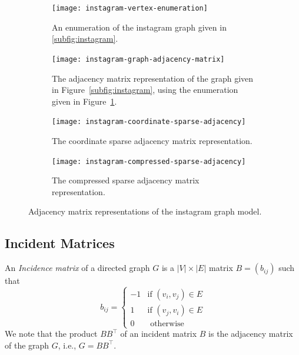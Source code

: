 \begin{figure}[tbh]
  \begin{subfigure}[t]{0.175\textwidth}
    \centering
    \texttt{[image: instagram-vertex-enumeration]}
    \caption{\label{fig:instagram-vertex-enumeration}
    An enumeration of the instagram graph given in \protect\ref{subfig:instagram}.}
  \end{subfigure}
  \hspace{1em}
  \begin{subfigure}[t]{0.25\textwidth}
    \centering
    \texttt{[image: instagram-graph-adjacency-matrix]}
    \caption{\label{fig:instagram-graph-adjacency-matrix}
    The adjacency matrix representation of the graph given in Figure~\protect\ref{subfig:instagram},
    using the enumeration given in Figure~\protect\ref{fig:instagram-vertex-enumeration}.}
  \end{subfigure}
  \hspace{1em}
  \begin{subfigure}[t]{0.175\textwidth}
    \small
    \centering
    \texttt{[image: instagram-coordinate-sparse-adjacency]}
    \caption{\label{fig:instagram-coordinate-sparse-adjacency}
    The coordinate sparse adjacency matrix representation.}
  \end{subfigure}
  \hspace{1em}
  \begin{subfigure}[t]{0.3\textwidth}
    \small
    \centering
    \texttt{[image: instagram-compressed-sparse-adjacency]}
    \caption{\label{fig:instagram-compressed-sparse-adjacency}
    The compressed sparse adjacency matrix representation.}
  \end{subfigure}
  \caption{Adjacency matrix representations of the instagram graph model.\label{fig:instagram}}
\end{figure}


\subsection{Incident Matrices}

An \emph{Incidence matrix} of a directed graph $G$ is a
$|V|\times |E|$ matrix $B = (b_{ij})$ such that
\[
 b_{i j} = 
 \left\{
 \begin{array}{rl}
  -1 & \textrm{if } (v_i, v_j) \in E \\
  1 & \textrm{if } (v_j, v_i) \in E \\
  0 & \textrm { otherwise }
 \end{array}
 \right.
 \]
 We note that the product $BB^\top$ of an incident matrix $B$ is the adjacency matrix
 of the graph $G$, i.e., $G=BB^\top$.


